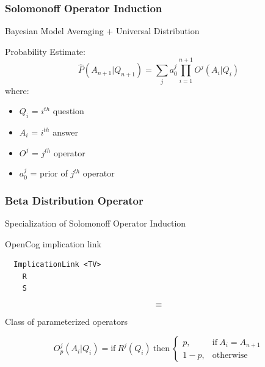 \documentclass{beamer}
\begin{document}
\begin{frame}
  \frametitle{Solomonoff Operator Induction}

  \begin{center}
    \alert{Bayesian Model Averaging + Universal Distribution}
  \end{center}

  Probability Estimate:
  $$
  \hat{P}(A_{n+1}|Q_{n+1}) = \sum_j a_0^j \prod_{i=1}^{n+1} O^j(A_i|Q_i)
  $$
  where:
  \begin{itemize}
  \item $Q_i$ = $i^{th}$ question
  \item $A_i$ = $i^{th}$ answer
  \item $O^j$ = $j^{th}$ operator
  \item $a^j_0$ = prior of $j^{th}$ operator
  \end{itemize}
\end{frame}

\begin{frame}[fragile]
  \frametitle{Beta Distribution Operator}

\begin{center}\alert{Specialization of Solomonoff Operator Induction}\end{center}

OpenCog implication link
{\small
\begin{verbatim}
  ImplicationLink <TV>
    R
    S
\end{verbatim}
}

$$
\equiv
$$

Class of parameterized operators

  $$
  O^j_p(A_i|Q_i) = \text{if}\ R^j(Q_i)\ \text{then}\
  \begin{cases}
    p, & \text{if}\ A_i = A_{n+1}\\
    1-p, & \text{otherwise}
  \end{cases}
  $$
\end{frame}
\end{document}
